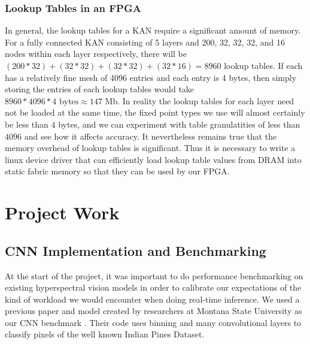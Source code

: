 \documentclass{article}
\begin{document}
\subsubsection{Lookup Tables in an FPGA}
In general, the lookup tables for a KAN require a significant amount of memory. For a fully connected KAN consisting of 5 layers and 200, 32, 32, 32, and 16 nodes within each layer respectively, there will be $(200 * 32) + (32 * 32) + (32 * 32) + (32 * 16) = 8960$ lookup tables. If each has a relatively fine mesh of 4096 entries and each entry is 4 bytes, then simply storing the entries of each lookup tables would take $8960 * 4096 * 4 \text{ bytes} \approx 147 \text{ Mb}$. In reality the lookup tables for each layer need not be loaded at the same time, the fixed point types we use will almost certainly be less than $4$ bytes, and we can experiment with table granulatities of less than $4096$ and see how it affects accuracy. It nevertheless remains true that the memory overhead of lookup tables is significant. Thus it is necessary to write a linux device driver that can efficiently load lookup table values from DRAM into static fabric memory so that they can be used by our FPGA.


\section{Project Work}

\subsection{CNN Implementation and Benchmarking}
At the start of the project, it was important to do performance benchmarking on existing hyperspectral vision models in order to calibrate our expectations of the kind of workload we would encounter when doing real-time inference. We used a previous paper and model created by researchers at Montana State University as our CNN benchmark \cite{Morales_2021} \cite{rs13183649}. Their code uses binning and many convolutional layers to classify pixels of the well known Indian Pines Dataset.
\end{document}
